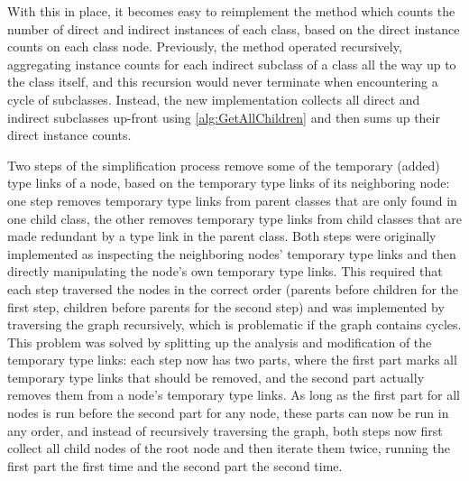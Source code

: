 With this in place,
it becomes easy to reimplement the method which counts the number of direct and indirect instances of each class,
based on the direct instance counts on each class node.
Previously, the method operated recursively,
aggregating instance counts for each indirect subclass of a class
all the way up to the class itself,
and this recursion would never terminate when encountering a cycle of subclasses.
Instead, the new implementation collects all direct and indirect subclasses up-front using \cref{alg:GetAllChildren}
and then sums up their direct instance counts.

Two steps of the simplification process %
remove some of the temporary (added) type links of a node,
based on the temporary type links of its neighboring node:
one step removes temporary type links from parent classes that are only found in one child class,
the other removes temporary type links from child classes that are made redundant by a type link in the parent class.
Both steps were originally implemented as inspecting the neighboring nodes’ temporary type links
and then directly manipulating the node’s own temporary type links.
This required that each step traversed the nodes in the correct order
(parents before children for the first step,
children before parents for the second step)
and was implemented by traversing the graph recursively,
which is problematic if the graph contains cycles.
This problem was solved by splitting up the analysis and modification of the temporary type links:
each step now has two parts,
where the first part marks all temporary type links that should be removed,
and the second part actually removes them from a node’s temporary type links.
As long as the first part for all nodes is run before the second part for any node,
these parts can now be run in any order,
and instead of recursively traversing the graph,
both steps now first collect all child nodes of the root node
and then iterate them twice,
running the first part the first time and the second part the second time.


